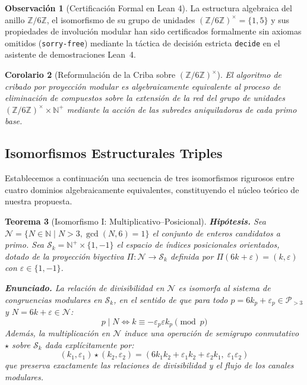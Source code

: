 \documentclass{article}
\numberwithin{equation}{section}
\newcommand{\ZZ}{\mathbb{Z}}
\theoremstyle{plain}
\newtheorem{theorem}{Teorema}[section]
\newtheorem{corollary}[theorem]{Corolario}
\theoremstyle{definition}
\newtheorem{remark}[theorem]{Observación}
\begin{document}
\begin{remark}[Certificación Formal en Lean 4]
\label{rem:certificacion-z6}
La estructura algebraica del anillo $\ZZ/6\ZZ$, el isomorfismo de su grupo de unidades $(\ZZ/6\ZZ)^\times = \{1, 5\}$ y sus propiedades de involución modular han sido certificados formalmente sin axiomas omitidos (\texttt{sorry-free}) mediante la táctica de decisión estricta \texttt{decide} en el asistente de demostraciones Lean~4.
\end{remark}

\begin{corollary}[Reformulación de la Criba sobre $(\ZZ/6\ZZ)^\times$]
\label{cor:interpretacion-grupal}
El algoritmo de cribado por proyección modular es algebraicamente equivalente al proceso de eliminación de compuestos sobre la extensión de la red del grupo de unidades $(\ZZ/6\ZZ)^\times \times \mathbb{N}^+$ mediante la acción de las subredes aniquiladoras de cada primo base.
\end{corollary}

\subsection{Isomorfismos Estructurales Triples}

Establecemos a continuación una secuencia de tres isomorfismos rigurosos entre cuatro dominios algebraicamente equivalentes, constituyendo el núcleo teórico de nuestra propuesta.

\begin{theorem}[Isomorfismo I: Multiplicativo--Posicional]
\label{thm:iso-I}
\textbf{Hipótesis.} Sea $\mathcal{N} = \{N \in \mathbb{N} \mid N > 3, \gcd(N, 6) = 1\}$ el conjunto de enteros candidatos a primo. Sea $\mathcal{S}_k = \mathbb{N}^+ \times \{1, -1\}$ el espacio de índices posicionales orientados, dotado de la proyección biyectiva $\Pi: \mathcal{N} \to \mathcal{S}_k$ definida por $\Pi(6k + \varepsilon) = (k, \varepsilon)$ con $\varepsilon \in \{1, -1\}$.

\textbf{Enunciado.} La relación de divisibilidad en $\mathcal{N}$ es isomorfa al sistema de congruencias modulares en $\mathcal{S}_k$, en el sentido de que para todo $p = 6k_p + \varepsilon_p \in \mathcal{P}_{>3}$ y $N = 6k + \varepsilon \in \mathcal{N}$:
\begin{equation}
p \mid N \iff k \equiv -\varepsilon_p \varepsilon k_p \pmod p
\end{equation}
Además, la multiplicación en $\mathcal{N}$ induce una operación de semigrupo conmutativo $\star$ sobre $\mathcal{S}_k$ dada explícitamente por:
\begin{equation}
(k_1, \varepsilon_1) \star (k_2, \varepsilon_2) = \left( 6k_1k_2 + \varepsilon_1 k_2 + \varepsilon_2 k_1,\; \varepsilon_1 \varepsilon_2 \right)
\end{equation}
que preserva exactamente las relaciones de divisibilidad y el flujo de los canales modulares.
\end{theorem}
\end{document}
